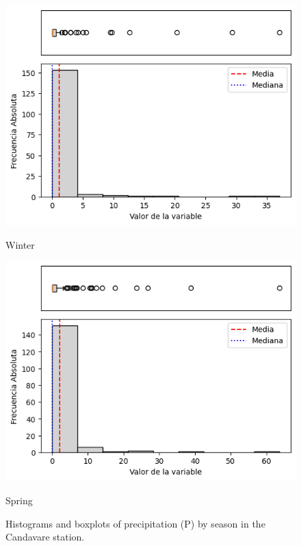 \begin{figure}[htbp]
\begin{minipage}{0.30\textwidth}
  \includegraphics[width=\linewidth]{resultados/por_estacion_del_anio/boxplot_clases_por_estacion/Candavare/P_HistBoxplot_Winter.png}
  \caption*{Winter}
\end{minipage}
\hfill
\begin{minipage}{0.30\textwidth}
  \includegraphics[width=\linewidth]{resultados/por_estacion_del_anio/boxplot_clases_por_estacion/Candavare/P_HistBoxplot_Spring.png}
  \caption*{Spring}
\end{minipage}
\caption{Histograms and boxplots of precipitation (P) by season in the Candavare station.}
\label{fig:candavare_p_hist}
\end{figure}

